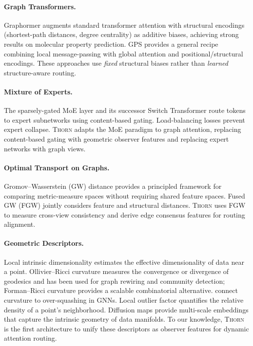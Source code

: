 \documentclass[11pt,a4paper]{article}
\newcommand{\thorn}{\textsc{Thorn}}
\begin{document}
\paragraph{Graph Transformers.}
Graphormer \citep{ying2021transformers} augments standard transformer
attention with structural encodings (shortest-path distances, degree
centrality) as additive biases, achieving strong results on molecular
property prediction.
GPS \citep{rampasek2022recipe} provides a general recipe combining local
message-passing with global attention and positional/structural
encodings.
These approaches use \emph{fixed} structural biases rather than
\emph{learned} structure-aware routing.

\paragraph{Mixture of Experts.}
The sparsely-gated MoE layer \citep{shazeer2017outrageously} and its
successor Switch Transformer \citep{fedus2022switch} route tokens to
expert subnetworks using content-based gating.
Load-balancing losses prevent expert collapse.
\thorn{} adapts the MoE paradigm to graph attention, replacing
content-based gating with geometric observer features and replacing
expert networks with graph views.

\paragraph{Optimal Transport on Graphs.}
Gromov--Wasserstein (GW) distance \citep{peyre2019computational}
provides a principled framework for comparing metric-measure spaces
without requiring shared feature spaces.
Fused GW (FGW) \citep{vayer2019optimal} jointly considers feature and
structural distances.
\thorn{} uses FGW to measure cross-view consistency and derive edge
consensus features for routing alignment.

\paragraph{Geometric Descriptors.}
Local intrinsic dimensionality \citep{levina2004maximum} estimates the
effective dimensionality of data near a point.
Ollivier--Ricci curvature \citep{ollivier2009ricci} measures the
convergence or divergence of geodesics and has been used for graph
rewiring and community detection;
Forman--Ricci curvature \citep{forman2003bochner} provides a scalable
combinatorial alternative.
\citet{topping2022understanding} connect curvature to over-squashing
in GNNs.
Local outlier factor \citep{breunig2000lof} quantifies the relative
density of a point's neighborhood.
Diffusion maps \citep{coifman2006diffusion} provide multi-scale
embeddings that capture the intrinsic geometry of data manifolds.
To our knowledge, \thorn{} is the first architecture to unify these
descriptors as observer features for dynamic attention routing.
\end{document}
